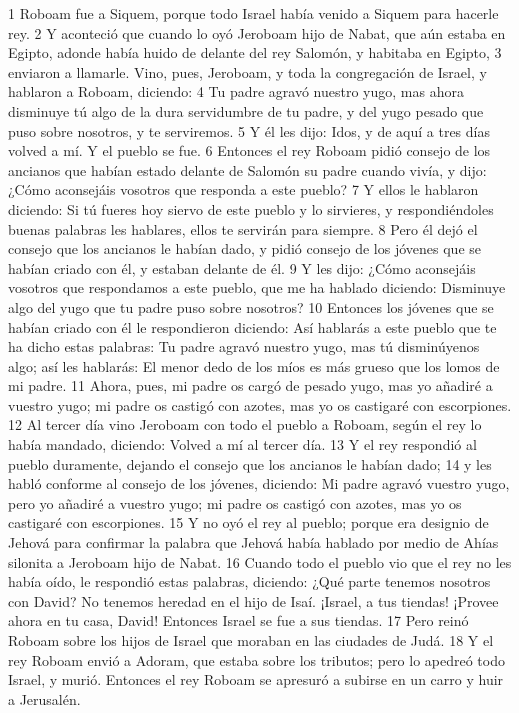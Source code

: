 1 Roboam fue a Siquem, porque todo Israel había venido a Siquem para hacerle rey. 
2 Y aconteció que cuando lo oyó Jeroboam hijo de Nabat, que aún estaba en Egipto, adonde había huido de delante del rey Salomón, y habitaba en Egipto,
3 enviaron a llamarle. Vino, pues, Jeroboam, y toda la congregación de Israel, y hablaron a Roboam, diciendo:
4 Tu padre agravó nuestro yugo, mas ahora disminuye tú algo de la dura servidumbre de tu padre, y del yugo pesado que puso sobre nosotros, y te serviremos.
5 Y él les dijo: Idos, y de aquí a tres días volved a mí. Y el pueblo se fue.
6 Entonces el rey Roboam pidió consejo de los ancianos que habían estado delante de Salomón su padre cuando vivía, y dijo: ¿Cómo aconsejáis vosotros que responda a este pueblo?
7 Y ellos le hablaron diciendo: Si tú fueres hoy siervo de este pueblo y lo sirvieres, y respondiéndoles buenas palabras les hablares, ellos te servirán para siempre.
8 Pero él dejó el consejo que los ancianos le habían dado, y pidió consejo de los jóvenes que se habían criado con él, y estaban delante de él.
9 Y les dijo: ¿Cómo aconsejáis vosotros que respondamos a este pueblo, que me ha hablado diciendo: Disminuye algo del yugo que tu padre puso sobre nosotros?
10 Entonces los jóvenes que se habían criado con él le respondieron diciendo: Así hablarás a este pueblo que te ha dicho estas palabras: Tu padre agravó nuestro yugo, mas tú disminúyenos algo; así les hablarás: El menor dedo de los míos es más grueso que los lomos de mi padre.
11 Ahora, pues, mi padre os cargó de pesado yugo, mas yo añadiré a vuestro yugo; mi padre os castigó con azotes, mas yo os castigaré con escorpiones.
12 Al tercer día vino Jeroboam con todo el pueblo a Roboam, según el rey lo había mandado, diciendo: Volved a mí al tercer día.
13 Y el rey respondió al pueblo duramente, dejando el consejo que los ancianos le habían dado;
14 y les habló conforme al consejo de los jóvenes, diciendo: Mi padre agravó vuestro yugo, pero yo añadiré a vuestro yugo; mi padre os castigó con azotes, mas yo os castigaré con escorpiones.
15 Y no oyó el rey al pueblo; porque era designio de Jehová para confirmar la palabra que Jehová había hablado por medio de Ahías silonita a Jeroboam hijo de Nabat.
16 Cuando todo el pueblo vio que el rey no les había oído, le respondió estas palabras, diciendo: ¿Qué parte tenemos nosotros con David? No tenemos heredad en el hijo de Isaí. ¡Israel, a tus tiendas! ¡Provee ahora en tu casa, David! Entonces Israel se fue a sus tiendas.
17 Pero reinó Roboam sobre los hijos de Israel que moraban en las ciudades de Judá.
18 Y el rey Roboam envió a Adoram, que estaba sobre los tributos; pero lo apedreó todo Israel, y murió. Entonces el rey Roboam se apresuró a subirse en un carro y huir a Jerusalén.
